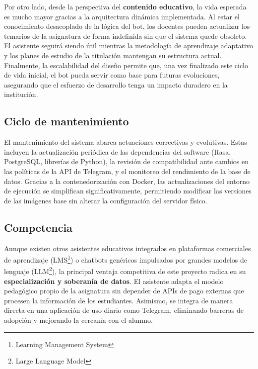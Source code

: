 \documentclass[a4paper,12pt,twoside,final]{book}
\begin{document}
Por otro lado, desde la perspectiva del \textbf{contenido educativo}, la vida esperada es mucho mayor gracias a la arquitectura dinámica implementada. Al estar el conocimiento desacoplado de la lógica del bot, los docentes pueden actualizar los temarios de la asignatura de forma indefinida sin que el sistema quede obsoleto. El asistente seguirá siendo útil mientras la metodología de aprendizaje adaptativo y los planes de estudio de la titulación mantengan su estructura actual.\\

Finalmente, la escalabilidad del diseño permite que, una vez finalizado este ciclo de vida inicial, el bot pueda servir como base para futuras evoluciones, asegurando que el esfuerzo de desarrollo tenga un impacto duradero en la institución.

\subsection{Ciclo de mantenimiento}

El mantenimiento del sistema abarca actuaciones correctivas y evolutivas. Estas incluyen la actualización periódica de las dependencias del software (Rasa, PostgreSQL, librerías de Python), la revisión de compatibilidad ante cambios en las políticas de la API de Telegram, y el monitoreo del rendimiento de la base de datos. Gracias a la contenedorización con Docker, las actualizaciones del entorno de ejecución se simplifican significativamente, permitiendo modificar las versiones de las imágenes base sin alterar la configuración del servidor físico.

\subsection{Competencia}

Aunque existen otros asistentes educativos integrados en plataformas comerciales de aprendizaje (LMS\footnote{Learning Management System}) o chatbots genéricos impulsados por grandes modelos de lenguaje (LLM\footnote{Large Language Model}), la principal ventaja competitiva de este proyecto radica en su \textbf{especialización y soberanía de datos}. El asistente adapta el modelo pedagógico propio de la asignatura sin depender de APIs de pago externas que procesen la información de los estudiantes. Asimismo, se integra de manera directa en una aplicación de uso diario como Telegram, eliminando barreras de adopción y mejorando la cercanía con el alumno.
\end{document}
